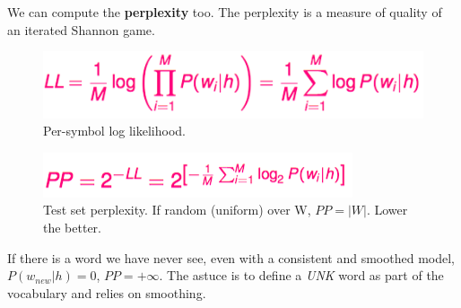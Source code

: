We can compute the \textbf{perplexity} too. The perplexity is a measure of quality of an iterated Shannon game.

\begin{figure}[H]
	\centering
	\includegraphics[scale=0.5]{images/20_log.png}
 	\caption{Per-symbol log likelihood.}
\end{figure}

\begin{figure}[H]
	\centering
	\includegraphics[scale=0.6]{images/21_perplexity.png}
 	\caption{Test set perplexity. If random (uniform) over W, $PP = |W|$. Lower the better.}
\end{figure}

If there is a word we have never see, even with a consistent and smoothed model, $P(w_{new}|h) = 0$, $PP = +\infty$. The astuce is to define a \textit{UNK} word as part of the vocabulary and relies on smoothing. 